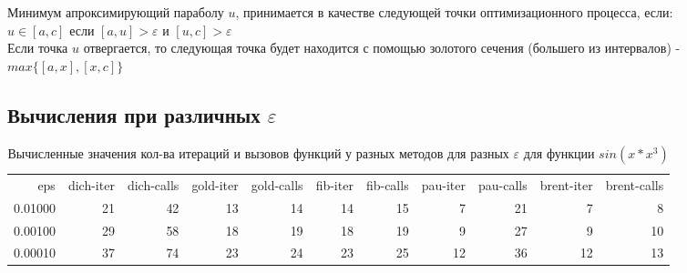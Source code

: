 \documentclass[fleqn]{article}
\begin{document}
Минимум апроксимирующий параболу $u$, принимается в качестве следующей точки оптимизационного процесса, если:\\

$u\in[a,c]$ если $[a,u]>\varepsilon$ и $[u,c]>\varepsilon$\\

Если точка $u$ отвергается, то следующая точка будет находится с помощью золотого сечения (большего из интервалов) - $max\{[a,x],[x,c]\}$\\

\subsection{Вычисления при различных $\varepsilon$}
\begin{table}[htp]
    \centering
    \caption{Вычисленные значения кол-ва итераций и вызовов функций у разных методов для разных $\varepsilon$ для функции $sin(x*x^3)$}
    \begin{tabular}{rrrrrrrrrrr}
    eps & dich-iter & dich-calls & gold-iter & gold-calls & fib-iter & fib-calls & pau-iter & pau-calls & brent-iter & brent-calls \\
    0.01000 & 21 & 42 & 13 & 14 & 14 & 15 & 7 & 21 & 7 & 8 \\
    0.00100 & 29 & 58 & 18 & 19 & 18 & 19 & 9 & 27 & 9 & 10 \\
    0.00010 & 37 & 74 & 23 & 24 & 23 & 25 & 12 & 36 & 12 & 13 \\
    \end{tabular}
\end{table}
\end{document}
